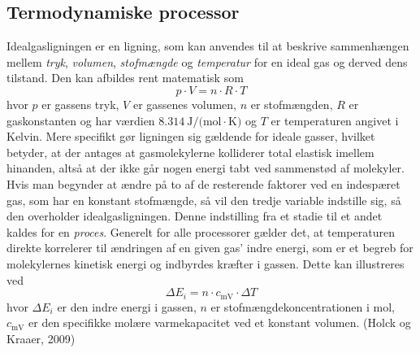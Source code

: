 \documentclass[SRC.tex]{subfiles}
\begin{document}
	\subsection{Termodynamiske processor}
	Idealgasligningen er en ligning, som kan anvendes til at beskrive sammenhængen mellem
	\textit{tryk}, \textit{volumen}, \textit{stofmængde} og \textit{temperatur} for en ideal 
	gas og derved dens tilstand. Den kan afbildes rent matematisk som
	\begin{equation}
	p \cdot V = n \cdot R \cdot T
	\label{eq:idealgasligningen}
	\end{equation}
	hvor \(p\) er gassens tryk, \(V\) er gassenes volumen, \(n\) er stofmængden, \(R\) er gaskonstanten
	og har værdien \(\SI{8.314}{\joule\per (\mole\cdot\kelvin)} \) og \(T\) er temperaturen angivet i 
	Kelvin. Mere specifikt gør ligningen sig 
	gældende for ideale gasser, hvilket betyder, at der antages at gasmolekylerne kolliderer 
	total elastisk imellem hinanden, altså at der ikke går nogen energi tabt ved sammenstød af 
	molekyler. Hvis man begynder at ændre på to af de resterende faktorer ved en indespæret gas, 
	som har en konstant stofmængde, så vil den tredje variable indstille sig, så den overholder
	idealgasligningen. Denne indstilling fra et stadie til et andet kaldes for en \textit{proces}. 
	Generelt for alle processorer gælder det, at temperaturen direkte korrelerer til ændringen af 
	en given gas' indre energi, som er et begreb for molekylernes kinetisk energi og indbyrdes 
	kræfter i gassen. Dette kan illustreres ved
	\begin{equation}
	\Delta E_i = n \cdot c_{\text{mV}} \cdot \Delta T
	\label{eq:2}
	\end{equation}
	hvor \(\Delta E_i\) er den indre energi i gassen, \(n\) er stofmængdekoncentrationen i mol, 
	\(c_{\text{mV}}\) er den specifikke molære varmekapacitet ved et konstant volumen. (Holck og Kraaer, 2009)
	
\end{document}
